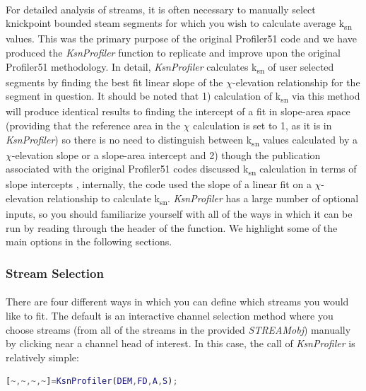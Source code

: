 \paragraph{}For detailed analysis of streams, it is often necessary to manually select knickpoint bounded steam segments for which you wish to calculate average k\textsubscript{sn} values. This was the primary purpose of the original Profiler51 code and we have produced the \textit{KsnProfiler} function to replicate and improve upon the original Profiler51 methodology. In detail, \textit{KsnProfiler} calculates k\textsubscript{sn} of user selected segments by finding the best fit linear slope of the $\chi$-elevation relationship for the segment in question. It should be noted that 1) calculation of k\textsubscript{sn} via this method will produce identical results to finding the intercept of a fit in slope-area space (providing that the reference area in the $\chi$ calculation is set to 1, as it is in \textit{KsnProfiler}) so there is no need to distinguish between k\textsubscript{sn} values calculated by a $\chi$-elevation slope or a slope-area intercept and 2) though the publication associated with the original Profiler51 codes discussed k\textsubscript{sn} calculation in terms of slope intercepts \citep{Wobus2006}, internally, the code used the slope of a linear fit on a $\chi$-elevation relationship to calculate k\textsubscript{sn}. \textit{KsnProfiler} has a large number of optional inputs, so you should familiarize yourself with all of the ways in which it can be run by reading through the header of the function. We highlight some of the main options in the following sections.

\subsubsection{Stream Selection}
\paragraph{}There are four different ways in which you can define which streams you would like to fit. The default is an interactive channel selection method where you choose streams (from all of the streams in the provided \textit{STREAMobj}) manually by clicking near a channel head of interest. In this case, the call of \textit{KsnProfiler} is relatively simple:

\begin{lstlisting}[language=Matlab]
[~,~,~,~]=KsnProfiler(DEM,FD,A,S);
\end{lstlisting}

